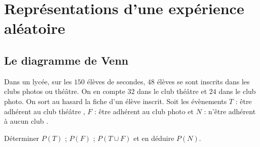 \newpage

\section{Représentations d'une expérience aléatoire}
\subsection{Le diagramme de Venn}
\begin{Exemple}
Dans un lycée, sur les $150$ élèves de secondes, $48$ élèves se sont inscrits dans les clubs photos ou théâtre. On en compte $32$ dans le club théâtre et $24$ dans le club photo. On sort au hasard la fiche d'un élève inscrit. Soit les évènements $T$ : \og être adhérent au club théâtre \fg{}, $F$ : \og être adhérent au club photo \fg{} et $N$ : \og n'être adhérent à aucun club \fg{}.

\noindent Déterminer $P(T)$ ; $P(F)$ ;  $P(T\cup F)$ et en déduire $P(N)$.

\begin{minipage}[c]{0.6\linewidth}

\vspace{0.3cm}

\ligne

\ligne

\ligne

\ligne

\ligne

\ligne

\ligne

\ligne

\end{minipage} \hfill
\begin{minipage}[c]{0.4\linewidth}
\begin{center}  
\end{center}
\end{minipage}

\end{Exemple}
